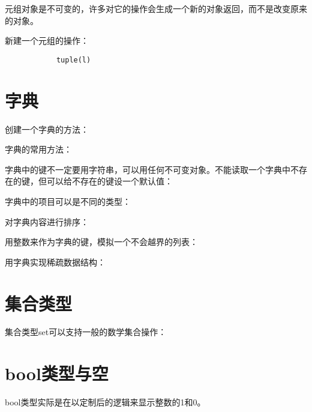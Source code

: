 		元组对象是不可变的，许多对它的操作会生成一个新的对象返回，而不是改变原来的对象。

		新建一个元组的操作：

		\begin{verbatim}
			tuple(l)
		\end{verbatim}
%		

	\section{字典}

		创建一个字典的方法：

		

		字典的常用方法：

		

		字典中的键不一定要用字符串，可以用任何不可变对象。不能读取一个字典中不存在的键，但可以给不存在的键设一个默认值：

		

		字典中的项目可以是不同的类型：

		

		对字典内容进行排序：

		

		用整数来作为字典的键，模拟一个不会越界的列表：

		

		用字典实现稀疏数据结构：

		

	\section{集合类型}

		集合类型set可以支持一般的数学集合操作：

		
		
	\section{bool类型与空}

		bool类型实际是在以定制后的逻辑来显示整数的1和0。

